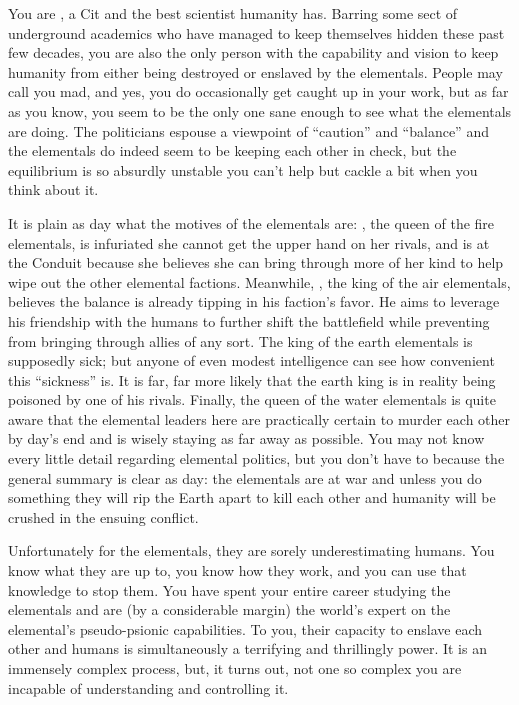 \documentclass[char]{elementals}
\begin{document}
\name{\cMS{}}

You are \cMS{\intro}, a Cit and the best scientist humanity has. Barring some sect of underground academics who have managed to keep themselves hidden these past few decades, you are also the only person with the capability and vision to keep humanity from either being destroyed or enslaved by the elementals. People may call you mad, and yes, you do occasionally get caught up in your work, but as far as you know, you seem to be the only one sane enough to see what the elementals are doing. The politicians espouse a viewpoint of ``caution'' and ``balance'' and the elementals do indeed seem to be keeping each other in check, but the equilibrium is so absurdly unstable you can't help but cackle a bit when you think about it.


It is plain as day what the motives of the elementals are: \cQueen{\intro}, the queen of the fire elementals, is infuriated she cannot get the upper hand on her rivals, and is at the Conduit because she believes she can bring through more of her kind to help wipe out the other elemental factions. Meanwhile, \cKing{\intro}, the king of the air elementals, believes the balance is already tipping in his faction's favor. He aims to leverage his friendship with the humans to further shift the battlefield while preventing \cQueen{} from bringing through allies of any sort. The king of the earth elementals is supposedly sick; but anyone of even modest intelligence can see how convenient this ``sickness'' is. It is far, far more likely that the earth king is in reality being poisoned by one of his rivals. Finally, the queen of the water elementals is quite aware that the elemental leaders here are practically certain to murder each other by day's end and is wisely staying as far away as possible. You may not know every little detail regarding elemental politics, but you don't have to because the general summary is clear as day: the elementals are at war and unless you do something they will rip the Earth apart to kill each other and humanity will be crushed in the ensuing conflict.

Unfortunately for the elementals, they are sorely underestimating humans. You know what they are up to, you know how they work, and you can use that knowledge to stop them. You have spent your entire career studying the elementals and are (by a considerable margin) the world's expert on the elemental's pseudo-psionic capabilities. To you, their capacity to enslave each other and humans is simultaneously a terrifying and thrillingly power. It is an immensely complex process, but, it turns out, not one so complex you are incapable of understanding and controlling it. 
\end{document}
